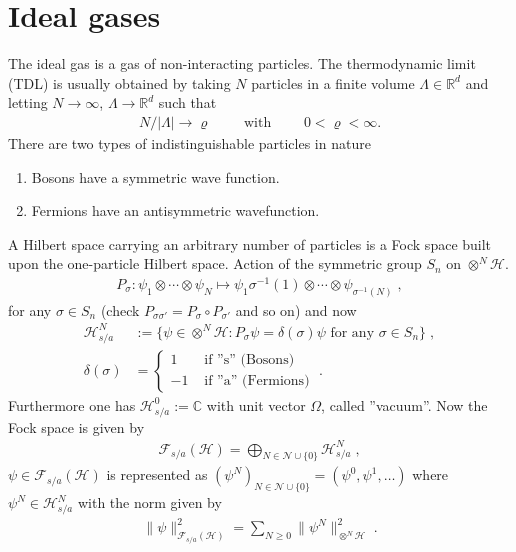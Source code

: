 \documentclass[
a4paper, %
11pt, %
onecolumn, %
openany, %
]{memoir}
\theoremstyle{definition}
\theoremstyle{remark}
\theoremstyle{plain}
\begin{document}
\chapter{Ideal gases}
The ideal gas is a gas of non-interacting particles. The thermodynamic limit (TDL) is usually obtained by taking $N$ particles in a  finite volume $\Lambda\in \mathbb{R}^d$ and letting $N\rightarrow\infty$, $\Lambda\rightarrow\mathbb{R}^d$ such that \begin{align}
N/|\Lambda|\rightarrow \varrho \qquad \text{ with } \qquad 0<\varrho < \infty.
\end{align}
There are two types of indistinguishable particles in nature \begin{enumerate}
	\item Bosons have a symmetric wave function.
	\item Fermions have an antisymmetric wavefunction.
\end{enumerate}
A Hilbert space carrying an arbitrary number of particles is a Fock space built upon the one-particle Hilbert space. Action of the symmetric group $S_n$ on $\otimes^N\mathcal{H}$. \begin{align}
P_{\sigma}:\psi_1\otimes \cdots \otimes \psi_N \longmapsto \psi_1{\sigma^{-1}(1)\otimes \cdots \otimes \psi_{\sigma^{-1}(N)}}\; ,
\end{align}
for any $\sigma\in S_n$ (check $P_{\sigma\sigma'}=P_{\sigma}\circ P_{\sigma'}$ and so on) and now \begin{align}
\mathcal{H}_{s/a}^{N}&:=\{\psi\in\otimes^N\mathcal{H}:P_{\sigma}\psi=\delta(\sigma)\psi \text{ for any } \sigma\in S_n\}\; ,\\\delta(\sigma)&=\begin{cases}
1 &\text{ if ''s'' (Bosons)}\\
-1 &\text{ if ''a'' (Fermions)}
\end{cases}\; .
\end{align}
Furthermore one has $\mathcal{H}_{s/a}^0:=\mathbb{C}$ with unit vector $\Omega$, called ''vacuum''. Now the Fock space is given by \begin{align}
\mathcal{F}_{s/a}(\mathcal{H})=\bigoplus_{N\in\mathcal{N}\cup\{0\}}\mathcal{H}_{s/a}^N\; ,
\end{align}
$\psi\in\mathcal{F}_{s/a}(\mathcal{H})$ is represented as $(\psi^N)_{N\in\mathcal{N}\cup\{0\}}=(\psi^0,\psi^1,\ldots)$ where $\psi^N\in\mathcal{H}^N_{s/a}$ with the norm given by \begin{align}
\|\psi\|^2_{\mathcal{F}_{s/a}(\mathcal{H})}=\sum_{N\geq 0}\|\psi^N\|^2_{\otimes^N\mathcal{H}}\; .
\end{align}
\end{document}
